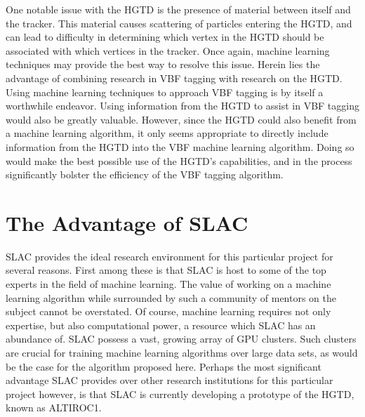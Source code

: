 \documentclass[12pt,letterpaper]{article}
\begin{document}
    One notable issue with the HGTD is the presence of material between itself and the tracker. This material causes scattering of particles entering the HGTD, and can lead to difficulty in determining which vertex in the HGTD should be associated with which vertices in the tracker. Once again, machine learning techniques may provide the best way to resolve this issue. Herein lies the advantage of combining research in VBF tagging with research on the HGTD. Using machine learning techniques to approach VBF tagging is by itself a worthwhile endeavor. Using information from the HGTD to assist in VBF tagging would also be greatly valuable. However, since the HGTD could also benefit from a machine learning algorithm, it only seems appropriate to directly include information from the HGTD into the VBF machine learning algorithm. Doing so would make the best possible use of the HGTD's capabilities, and in the process significantly bolster the efficiency of the VBF tagging algorithm.



\section*{The Advantage of SLAC}
    SLAC provides the ideal research environment for this particular project for several reasons. First among these is that SLAC is host to some of the top experts in the field of machine learning. The value of working on a machine learning algorithm while surrounded by such a community of mentors on the subject cannot be overstated. Of course, machine learning requires not only expertise, but also computational power, a resource which SLAC has an abundance of. SLAC possess a vast, growing array of GPU clusters. Such clusters are crucial for training machine learning algorithms over large data sets, as would be the case for the algorithm proposed here. Perhaps the most significant advantage SLAC provides over other research institutions for this particular project however, is that SLAC is currently developing a prototype of the HGTD, known as ALTIROC1.
\end{document}
